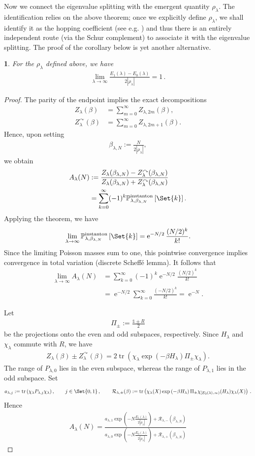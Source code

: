 \documentclass[a4paper,10pt]{article}
\numberwithin{equation}{section}
\theoremstyle{plain}
\theoremstyle{plain}
\theoremstyle{plain}
\newtheorem{cor}[thm]{\protect\corollaryname}
\theoremstyle{plain}
\theoremstyle{plain}
\theoremstyle{remark}
\theoremstyle{definition}
\providecommand{\corollaryname}{Corollary}
\newcommand{\ee}{\operatorname{e}}
\newcommand{\calR}{\mathcal{R}}
\newcommand{\tr}{\operatorname{tr}}
\newcommand{\Id}{\mathds{1}}
\newcommand{\abs}[1]{\left\lvert#1\right\rvert}
\newcommand{\eq}[1]{\begin{align*}#1\end{align*}}
\newcommand{\eql}[1]{\begin{align}#1\end{align}}
\newcommand{\br}[1]{\left(#1\right)}
\begin{document}
Now we connect the eigenvalue splitting with the emergent quantity $\rho_\lambda$. The identification relies on the above theorem; once we explicitly define $\rho_\lambda$, we shall identify it as the hopping coefficient (see e.g. \cite{FeffermanShapiroWeinstein2022,Fefferman2025}) and thus there is an entirely independent route (via the Schur complement) to associate it with the eigenvalue splitting. The proof of the corollary below is yet another alternative.
\begin{cor}\label{cor:eigenvalue splitting controlled by rho}
    For the $\rho_\lambda$ defined above, we have
    \eql{
    \lim_{\lambda\to\infty}\frac{E_1(\lambda)-E_0(\lambda)}{2\abs{\rho_\lambda}} = 1\,.
    }
\end{cor}

\begin{proof}
The parity of the endpoint implies the exact decompositions
\eq{
Z_\lambda(\beta)
&=
\sum_{m=0}^{\infty}Z_{\lambda,2m}(\beta),\\
Z_\lambda^{\curvearrowright}(\beta)
&=
\sum_{m=0}^{\infty}Z_{\lambda,2m+1}(\beta).
}
Hence, upon setting
\eq{
\beta_{\lambda,N}:=\frac{N}{2\abs{\rho_\lambda}},
}
we obtain
\eq{
A_\lambda(N)
&:=
\frac{
Z_\lambda(\beta_{\lambda,N})
-
Z_\lambda^{\curvearrowright}(\beta_{\lambda,N})
}{
Z_\lambda(\beta_{\lambda,N})
+
Z_\lambda^{\curvearrowright}(\beta_{\lambda,N})
}\\
&=
\sum_{k=0}^{\infty}
(-1)^k
\mathbb{P}_{\lambda,\beta_{\lambda,N}}^{\mathrm{instanton}}
\left[\Set{k}\right].
}
Applying the theorem, we have
\eq{
\lim_{\lambda\to\infty}
\mathbb{P}_{\lambda,\beta_{\lambda,N}}^{\mathrm{instanton}}
\left[\Set{k}\right]
=
\ee^{-N/2}\frac{(N/2)^k}{k!}.
}
Since the limiting Poisson masses sum to one, this pointwise
convergence implies convergence in total variation (discrete Scheffé lemma). It follows that
\eq{
\lim_{\lambda\to\infty}A_\lambda(N)
&=
\sum_{k=0}^{\infty}
(-1)^k\ee^{-N/2}\frac{(N/2)^k}{k!}\\
&=
\ee^{-N/2}
\sum_{k=0}^{\infty}\frac{(-N/2)^k}{k!}
=
\ee^{-N}.
}

Let
\eq{
\Pi_\pm:=\frac{\Id\pm R}{2}
}
be the projections onto the even and odd subspaces, respectively.
Since $H_\lambda$ and $\chi_\lambda$ commute with $R$, we have
\eq{
Z_\lambda(\beta)\pm Z_\lambda^{\curvearrowright}(\beta)
=
2\tr\br{
\chi_\lambda
\exp\br{-\beta H_\lambda}
\Pi_\pm
\chi_\lambda
}.
}
The range of $P_{\lambda,0}$ lies in the even subspace, whereas the
range of $P_{\lambda,1}$ lies in the odd subspace. Set
\eq{
a_{\lambda,j}
:=
\tr\br{
\chi_\lambda P_{\lambda,j}\chi_\lambda
},
\qquad j\in\Set{0,1}\,,\,\qquad \calR_{\lambda,\pm}(\beta) := \tr\br{\chi_\lambda(X)\exp\br{-\beta H_\lambda}\Pi_\pm \chi_{[E_2(\lambda),\infty)}(H_\lambda) \chi_\lambda(X)}\,.
} %
Hence
\eq{
A_\lambda(N) = \frac{a_{\lambda,1}
\exp\br{
-N\frac{E_1(\lambda)}
        {2\abs{\rho_\lambda}}
}+\calR_{\lambda,-}(\beta_{\lambda,N})}{a_{\lambda,0}\exp\br{
-N\frac{E_0(\lambda)}
        {2\abs{\rho_\lambda}}
}+\calR_{\lambda,+}(\beta_{\lambda,N})}
}


\end{proof}
\end{document}
